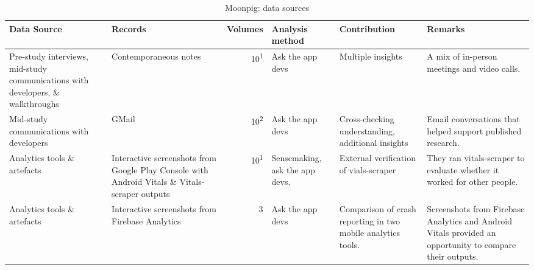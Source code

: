 \begin{table*}
    \centering
    \footnotesize
    \tabcolsep=0.12cm
    \begin{tabular}{p{2.6cm}p{2.9cm}r>{\raggedright}p{2.1cm}>{\raggedright\arraybackslash}p{2.5cm}>{\raggedright\arraybackslash}p{3cm}}
        Data Source & Records & Volumes & Analysis method & Contribution & Remarks \\
        \toprule
         Pre-study interviews, mid-study communications with developers, \& walkthroughs & Contemporaneous notes & 10\textsuperscript{1} & Ask the app devs & Multiple insights & A mix of in-person meetings and video calls.  \\
         Mid-study communications with developers & GMail & 10\textsuperscript{2} & Ask the app devs & Cross-checking understanding, additional insights & Email conversations that helped support published research. \\
         Analytics tools \& artefacts &Interactive screenshots from Google Play Console with Android Vitals \& Vitals-scraper outputs &10\textsuperscript{1} & Sensemaking, ask the app devs. & External verification of vials-scraper & They ran vitals-scraper to evaluate whether it worked for other people. \\
         Analytics tools \& artefacts & Interactive screenshots from Firebase Analytics & 3 & Ask the app devs & Comparison of crash reporting in two mobile analytics tools. & Screenshots from Firebase Analytics and Android Vitals provided an opportunity to compare their outputs. \\
         \bottomrule
    \end{tabular}
    \caption{Moonpig: data sources}
    \label{tab:moonpig-data-sources}
\end{table*}





